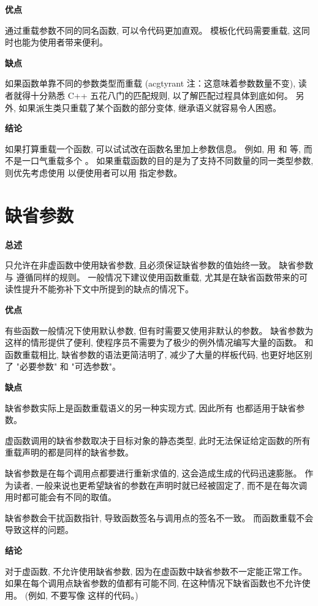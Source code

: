 \textbf{优点}

通过重载参数不同的同名函数, 可以令代码更加直观。 模板化代码需要重载, 这同时也能为使用者带来便利。

\textbf{缺点}

如果函数单靠不同的参数类型而重载 (acgtyrant 注：这意味着参数数量不变), 读者就得十分熟悉 C++ 五花八门的匹配规则, 以了解匹配过程具体到底如何。 另外, 如果派生类只重载了某个函数的部分变体, 继承语义就容易令人困惑。

\textbf{结论}

如果打算重载一个函数, 可以试试改在函数名里加上参数信息。 例如, 用  和  等, 而不是一口气重载多个 。 如果重载函数的目的是为了支持不同数量的同一类型参数, 则优先考虑使用  以便使用者可以用  指定参数。

\section{缺省参数}

\textbf{总述}

只允许在非虚函数中使用缺省参数, 且必须保证缺省参数的值始终一致。 缺省参数与  遵循同样的规则。 一般情况下建议使用函数重载, 尤其是在缺省函数带来的可读性提升不能弥补下文中所提到的缺点的情况下。

\textbf{优点}

有些函数一般情况下使用默认参数, 但有时需要又使用非默认的参数。 缺省参数为这样的情形提供了便利, 使程序员不需要为了极少的例外情况编写大量的函数。 和函数重载相比, 缺省参数的语法更简洁明了, 减少了大量的样板代码, 也更好地区别了 "必要参数" 和 "可选参数"。

\textbf{缺点}

缺省参数实际上是函数重载语义的另一种实现方式, 因此所有  也都适用于缺省参数。

虚函数调用的缺省参数取决于目标对象的静态类型, 此时无法保证给定函数的所有重载声明的都是同样的缺省参数。

缺省参数是在每个调用点都要进行重新求值的, 这会造成生成的代码迅速膨胀。 作为读者, 一般来说也更希望缺省的参数在声明时就已经被固定了, 而不是在每次调用时都可能会有不同的取值。

缺省参数会干扰函数指针, 导致函数签名与调用点的签名不一致。 而函数重载不会导致这样的问题。

\textbf{结论}

对于虚函数, 不允许使用缺省参数, 因为在虚函数中缺省参数不一定能正常工作。 如果在每个调用点缺省参数的值都有可能不同, 在这种情况下缺省函数也不允许使用。 (例如, 不要写像  这样的代码。)

